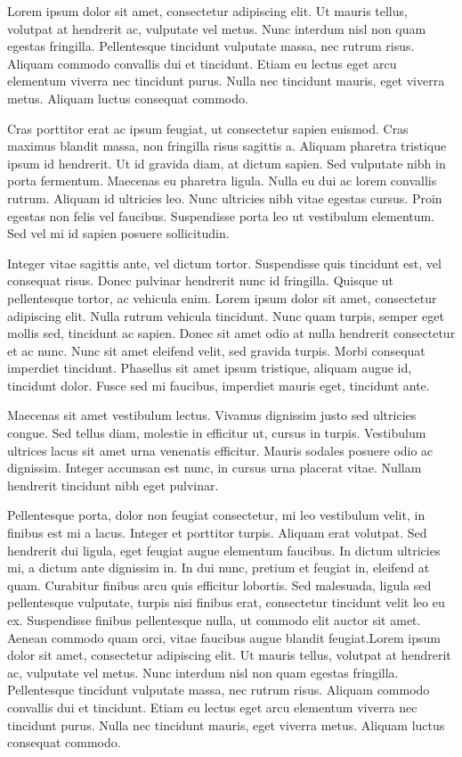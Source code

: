 \documentclass[a4paper]{article}
\begin{document}
Lorem ipsum dolor sit amet, consectetur adipiscing elit. Ut mauris tellus, volutpat at hendrerit ac, vulputate vel metus. Nunc interdum nisl non quam egestas fringilla. Pellentesque tincidunt vulputate massa, nec rutrum risus. Aliquam commodo convallis dui et tincidunt. Etiam eu lectus eget arcu elementum viverra nec tincidunt purus. Nulla nec tincidunt mauris, eget viverra metus. Aliquam luctus consequat commodo.

Cras porttitor erat ac ipsum feugiat, ut consectetur sapien euismod. Cras maximus blandit massa, non fringilla risus sagittis a. Aliquam pharetra tristique ipsum id hendrerit. Ut id gravida diam, at dictum sapien. Sed vulputate nibh in porta fermentum. Maecenas eu pharetra ligula. Nulla eu dui ac lorem convallis rutrum. Aliquam id ultricies leo. Nunc ultricies nibh vitae egestas cursus. Proin egestas non felis vel faucibus. Suspendisse porta leo ut vestibulum elementum. Sed vel mi id sapien posuere sollicitudin.

Integer vitae sagittis ante, vel dictum tortor. Suspendisse quis tincidunt est, vel consequat risus. Donec pulvinar hendrerit nunc id fringilla. Quisque ut pellentesque tortor, ac vehicula enim. Lorem ipsum dolor sit amet, consectetur adipiscing elit. Nulla rutrum vehicula tincidunt. Nunc quam turpis, semper eget mollis sed, tincidunt ac sapien. Donec sit amet odio at nulla hendrerit consectetur et ac nunc. Nunc sit amet eleifend velit, sed gravida turpis. Morbi consequat imperdiet tincidunt. Phasellus sit amet ipsum tristique, aliquam augue id, tincidunt dolor. Fusce sed mi faucibus, imperdiet mauris eget, tincidunt ante.

Maecenas sit amet vestibulum lectus. Vivamus dignissim justo sed ultricies congue. Sed tellus diam, molestie in efficitur ut, cursus in turpis. Vestibulum ultrices lacus sit amet urna venenatis efficitur. Mauris sodales posuere odio ac dignissim. Integer accumsan est nunc, in cursus urna placerat vitae. Nullam hendrerit tincidunt nibh eget pulvinar.

Pellentesque porta, dolor non feugiat consectetur, mi leo vestibulum velit, in finibus est mi a lacus. Integer et porttitor turpis. Aliquam erat volutpat. Sed hendrerit dui ligula, eget feugiat augue elementum faucibus. In dictum ultricies mi, a dictum ante dignissim in. In dui nunc, pretium et feugiat in, eleifend at quam. Curabitur finibus arcu quis efficitur lobortis. Sed malesuada, ligula sed pellentesque vulputate, turpis nisi finibus erat, consectetur tincidunt velit leo eu ex. Suspendisse finibus pellentesque nulla, ut commodo elit auctor sit amet. Aenean commodo quam orci, vitae faucibus augue blandit feugiat.Lorem ipsum dolor sit amet, consectetur adipiscing elit. Ut mauris tellus, volutpat at hendrerit ac, vulputate vel metus. Nunc interdum nisl non quam egestas fringilla. Pellentesque tincidunt vulputate massa, nec rutrum risus. Aliquam commodo convallis dui et tincidunt. Etiam eu lectus eget arcu elementum viverra nec tincidunt purus. Nulla nec tincidunt mauris, eget viverra metus. Aliquam luctus consequat commodo.
\end{document}
